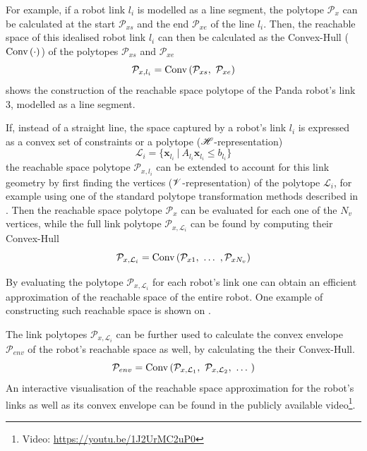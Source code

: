 For example, if a robot link $l_i$ is modelled as a line segment, the polytope $\mathcal{P}_x$ can be calculated at the start $\mathcal{P}_{xs}$ and the end $\mathcal{P}_{xe}$ of the line $l_i$. Then, the reachable space of this idealised robot link $l_i$ can then be calculated as the Convex-Hull ($\text{Conv}\left(\cdot\right)$) of the polytopes $\mathcal{P}_{xs}$ and $\mathcal{P}_{xe}$
\begin{equation}
    \mathcal{P}_{x,l_i} = \text{Conv}\left(  \mathcal{P}_{xs}, ~ \mathcal{P}_{xe}\right)
\end{equation}
 shows the construction of  the reachable space polytope of the Panda robot's link 3, modelled as a line segment.

If, instead of a straight line, the space captured by a robot's link $l_i$ is expressed as a convex set of constraints or a polytope ($\mathscr{H}$-representation)
\begin{equation}
    \mathcal{L}_i = \Big \{ \bm{x}_{l_i} ~ |~ A_{l_i} \bm{x}_{l_i} \leq b_{l_i} \Big\}
\end{equation}
the reachable space polytope $\mathcal{P}_{x,l_i}$ can be extended to account for this link geometry by first finding the vertices ($\mathscr{V}$-representation) of the polytope $\mathcal{L}_i$, for example using one of the standard polytope transformation methods described in . Then the reachable space polytope $\mathcal{P}_{x}$ can be evaluated for each one of the $N_v$ vertices, while the full link polytope $\mathcal{P}_{x,\mathcal{L}_i}$ can be found by computing their Convex-Hull
\begin{equation}
    \mathcal{P}_{x,\mathcal{L}_i} = \text{Conv}\left(  \mathcal{P}_{x1}, ~ \dots ~, \mathcal{P}_{xN_v} \right)
\end{equation}

By evaluating the polytope $\mathcal{P}_{x,\mathcal{L}_i}$ for each robot's link one can obtain an efficient approximation of the reachable space of the entire robot. One example of constructing such reachable space is shown on .

The link polytopes $\mathcal{P}_{x,\mathcal{L}_i}$ can be further used to calculate the convex envelope $\mathcal{P}_{env}$ of the robot's reachable space as well, by calculating the their Convex-Hull.
\begin{equation}
    \mathcal{P}_{env} = \text{Conv}\left(  \mathcal{P}_{x,\mathcal{L}_1},~ \mathcal{P}_{x,\mathcal{L}_2}, ~ \dots ~ \right)
\end{equation}
An interactive visualisation of the reachable space approximation for the robot's links as well as its convex envelope can be found in the publicly available video\footnote{Video: \url{https://youtu.be/1J2UrMC2uP0}}.

